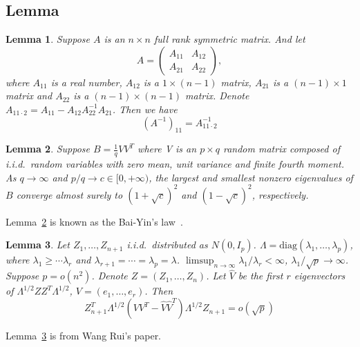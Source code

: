 \documentclass[review]{elsarticle}
\theoremstyle{plain}
\newtheorem{lemma}{Lemma}
\theoremstyle{definition}
\theoremstyle{remark}
\begin{document}
\subsection{Lemma}

\begin{lemma}\label{matrixInv}
    Suppose $A$ is an $n\times n$ full rank symmetric matrix. And let 
    \begin{equation}
        A=\begin{pmatrix}
            A_{11} & A_{12}\\
            A_{21} & A_{22}
        \end{pmatrix},
    \end{equation}
    where $A_{11}$ is a real number, $A_{12}$ is a $1\times (n-1)$ matrix, $A_{21}$ is a $(n-1)\times 1$ matrix and $A_{22}$ is a $(n-1)\times (n-1)$ matrix. Denote $A_{11\cdot 2}=A_{11}-A_{12}A_{22}^{-1}A_{21}$. Then we have
    \begin{equation}
        {(A^{-1})}_{11}=A_{11\cdot 2}^{-1}
    \end{equation}
\end{lemma}

\begin{lemma}\label{baiyin}
    Suppose $B=\frac{1}{q}V V^T$ where V is an $p\times q$ random matrix composed of i.i.d.\  random variables with zero mean, unit variance and finite fourth moment.
    As $q\to \infty$ and $p/q \to c\in [0,+\infty)$, the largest and smallest nonzero eigenvalues of $B$ converge almost surely to ${(1+\sqrt{c})}^2$ and ${(1-\sqrt{c})}^2$, respectively.
\end{lemma}
Lemma~\ref{baiyin} is known as the Bai-Yin's law~\cite{Bai1993Limit}.

\begin{lemma}\label{wangPCA}
    Let $Z_1,\ldots,Z_{n+1}$ i.i.d.\ distributed as $N(0,I_p)$.
    $\Lambda=\textrm{diag}(\lambda_1,\ldots,\lambda_p)$, where $\lambda_1\geq \cdots \lambda_r$ and $\lambda_{r+1}=\cdots =\lambda_p=\lambda$.
    $\limsup_{n\to \infty} \lambda_1/\lambda_r<\infty$, $\lambda_1/\sqrt{p}\to \infty$.
    Suppose $p=o(n^2)$.
    Denote $Z=(Z_1,\ldots,Z_n)$. Let $\hat{V}$ be the first $r$ eigenvectors of $\Lambda^{1/2}Z Z^T\Lambda^{1/2}$, $V=(e_1,\ldots,e_r)$. Then
    \begin{equation}
        Z_{n+1}^T \Lambda^{1/2}(VV^T -\hat{V}\hat{V}^T)\Lambda^{1/2}Z_{n+1}=o(\sqrt{p})
    \end{equation}
\end{lemma}
Lemma~\ref{wangPCA} is from Wang Rui's paper.
\end{document}
